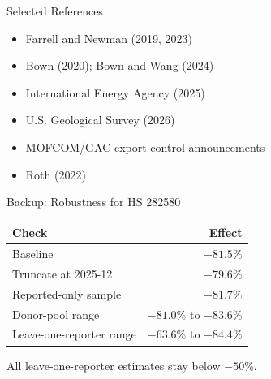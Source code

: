 \documentclass[aspectratio=169,11pt]{beamer}
\begin{document}
\appendix

\begin{frame}[noframenumbering]{Selected References}
  \small
  \begin{itemize}
    \item Farrell and Newman (2019, 2023)
    \item Bown (2020); Bown and Wang (2024)
    \item International Energy Agency (2025)
    \item U.S. Geological Survey (2026)
    \item MOFCOM/GAC export-control announcements
    \item Roth (2022)
  \end{itemize}
\end{frame}

\begin{frame}[noframenumbering]{Backup: Robustness for HS 282580}
  \large
  \begin{tabular}{lr}
    \toprule
    Check & Effect \\
    \midrule
    Baseline & \(-81.5\%\) \\
    Truncate at 2025-12 & \(-79.6\%\) \\
    Reported-only sample & \(-81.7\%\) \\
    Donor-pool range & \(-81.0\%\) to \(-83.6\%\) \\
    Leave-one-reporter range & \(-63.6\%\) to \(-84.4\%\) \\
    \bottomrule
  \end{tabular}

  \vspace{0.5cm}
  \normalsize All leave-one-reporter estimates stay below \(-50\%\).
\end{frame}
\end{document}
